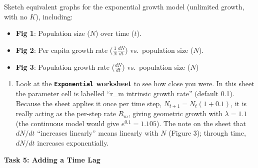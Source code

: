 \documentclass[
  a4paper]{book}
\providecommand{\tightlist}{%
  \setlength{\itemsep}{0pt}\setlength{\parskip}{0pt}}
\begin{document}
Sketch equivalent graphs for the exponential growth model (unlimited growth, with no \(K\)), including:

\begin{itemize}
\tightlist
\item
  \textbf{Fig 1}: Population size (\(N\)) over time (\(t\)).
\item
  \textbf{Fig 2}: Per capita growth rate (\(\frac{1}{N} \frac{dN}{dt}\)) vs.~population size (\(N\)).
\item
  \textbf{Fig 3}: Population growth rate (\(\frac{dN}{dt}\)) vs.~population size (\(N\))
\end{itemize}

\begin{enumerate}
\def\labelenumi{\arabic{enumi}.}
\setcounter{enumi}{1}
\tightlist
\item
  Look at the \textbf{\texttt{Exponential} worksheet} to see how close you were. In this sheet the parameter cell is labelled ``r\_m intrinsic growth rate'' (default 0.1). Because the sheet applies it once per time step, \(N_{t+1} = N_t(1 + 0.1)\), it is really acting as the per-step rate \(R_m\), giving geometric growth with \(\lambda = 1.1\) (the continuous model would give \(e^{0.1} = 1.105\)). The note on the sheet that \(dN/dt\) ``increases linearly'' means linearly with \(N\) (Figure 3); through time, \(dN/dt\) increases exponentially.
\end{enumerate}

\textbf{Task 5: Adding a Time Lag}
\end{document}
